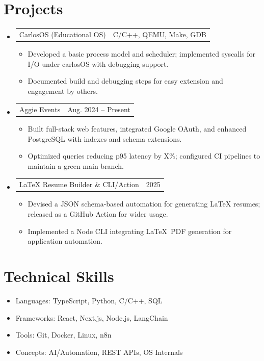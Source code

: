 \documentclass[letterpaper,11pt]{article}
\makeatletter
\newcommand{\resumeItem}[1]{
  \item\small{{#1 \vspace{-2pt}}}
}
\newcommand{\resumeProjectHeading}[2]{
    \item
    \begin{tabular*}{0.97\textwidth}{l@{\extracolsep{\fill}}r}
      \small#1 & #2 \\
    \end{tabular*}\vspace{-7pt}
}
\newcommand{\resumeSubHeadingListStart}{\begin{itemize}[leftmargin=0.15in, label={}]}
\newcommand{\resumeSubHeadingListEnd}{\end{itemize}}
\newcommand{\resumeItemListStart}{\begin{itemize}}
\newcommand{\resumeItemListEnd}{\end{itemize}\vspace{-5pt}}
\makeatother
\begin{document}
\vspace{-6pt}
\section{Projects}
\resumeSubHeadingListStart
\resumeProjectHeading
{CarlosOS (Educational OS)}{C/C++, QEMU, Make, GDB}
\resumeItemListStart
\resumeItem{Developed a basic process model and scheduler; implemented syscalls for I/O under carlosOS with debugging support.}
\resumeItem{Documented build and debugging steps for easy extension and engagement by others.}
\resumeItemListEnd

\resumeProjectHeading
{Aggie Events}{Aug. 2024 -- Present}
\resumeItemListStart
\resumeItem{Built full-stack web features, integrated Google OAuth, and enhanced PostgreSQL with indexes and schema extensions.}
\resumeItem{Optimized queries reducing p95 latency by {X}\%; configured CI pipelines to maintain a green main branch.}
\resumeItemListEnd

\resumeProjectHeading
{LaTeX Resume Builder \& CLI/Action}{2025}
\resumeItemListStart
\resumeItem{Devised a JSON schema-based automation for generating LaTeX resumes; released as a GitHub Action for wider usage.}
\resumeItem{Implemented a Node CLI integrating \LaTeX\ PDF generation for application automation.}
\resumeItemListEnd
\resumeSubHeadingListEnd

\vspace{-6pt}
\section{Technical Skills}
\begin{itemize}[leftmargin=0.15in, label={}]
    \item Languages: TypeScript, Python, C/C++, SQL
    \item Frameworks: React, Next.js, Node.js, LangChain
    \item Tools: Git, Docker, Linux, n8n
    \item Concepts: AI/Automation, REST APIs, OS Internals
\end{itemize}
\end{document}
